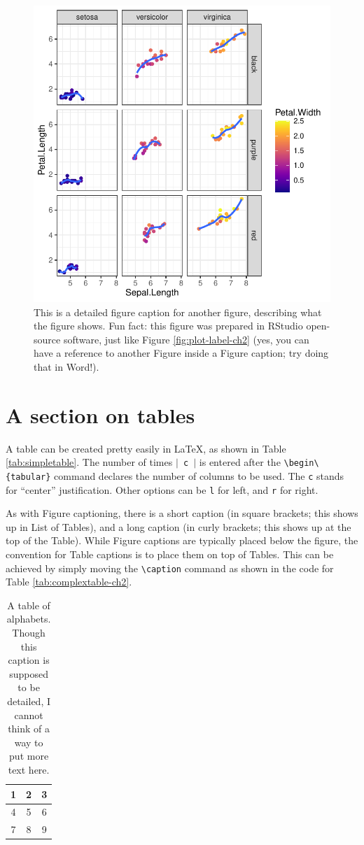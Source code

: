 \begin{figure}[!h]
\centering
\includegraphics[width=0.7\linewidth]{"ch02/Some_Other_Plot"}
\caption[Another figure]{This is a detailed figure caption for another figure, describing what the figure shows. Fun fact: this figure was prepared in RStudio open-source software, just like Figure \ref{fig:plot-label-ch2} (yes, you can have a reference to another Figure inside a Figure caption; try doing that in Word!).}
\label{fig:plot2-label-ch2}
\end{figure}

\section{A section on tables}\label{tables-sec}
A table can be created pretty easily in \LaTeX{}, as shown in Table \ref{tab:simpletable}. The number of times $\vert$\verb| c |$\vert$ is entered after the \verb|\begin\{tabular}| command declares the number of columns to be used. The \verb|c| stands for ``center'' justification. Other options can be \verb|l| for left, and \verb|r| for right.

As with Figure captioning, there is a short caption (in square brackets; this shows up in List of Tables), and a long caption (in curly brackets; this shows up at the top of the Table). While Figure captions are typically placed below the figure, the convention for Table captions is to place them on top of Tables. This can be achieved by simply moving the \verb|\caption| command as shown in the code for Table \ref{tab:complextable-ch2}.

\begin{table}[!h]
\begin{center}
  \begin{tabular}{| c | c | c |}
    \hline
    1 & 2 & 3 \\ \hline
    4 & 5 & 6 \\ \hline
    7 & 8 & 9 \\
    \hline
  \end{tabular}
\caption[A small, simple table]{A table of alphabets. Though this caption is supposed to be detailed, I cannot think of a way to put more text here.}
\label{tab:simpletable-ch2}
\end{center}
\end{table}

